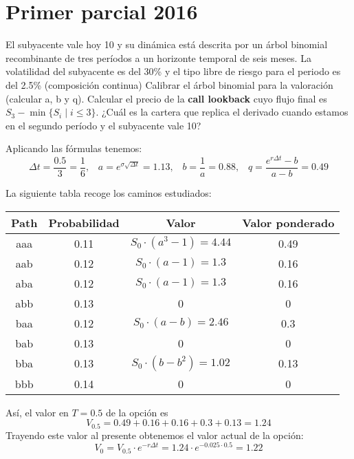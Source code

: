\section{Primer parcial 2016}
\begin{problem}[1]
El subyacente vale hoy 10 y su dinámica está descrita por un árbol binomial recombinante de tres períodos a un horizonte temporal de seis meses. La volatilidad del subyacente es del 30\% y el tipo libre de riesgo para el periodo es del 2.5\% (composición continua)
\ppart Calibrar el árbol binomial para la valoración (calcular a, b y q).
\ppart Calcular el precio de la \textbf{call lookback} cuyo flujo final es $S_3-\min\{S_i \mid i \leq 3\}$.
\ppart ¿Cuál es la cartera que replica el derivado cuando estamos en el segundo período y el subyacente vale 10?
\solution
{}

\spart
Aplicando las fórmulas tenemos:
\[Δt = \frac{0.5}{3} = \frac{1}{6},\;\;\; a=e^{σ\sqrt{Δt}}=1.13, \;\;\; b=\frac{1}{a}=0.88, \;\;\; q = \frac{e^{rΔt}-b}{a-b}=0.49\]

\spart

La siguiente tabla recoge los caminos estudiados:
\begin{center}
\begin{tabular}{|c|c|c|c|}
\hline
\textbf{Path} & \textbf{Probabilidad} & \textbf{Valor} & \textbf{Valor ponderado}\\
\hline
aaa & 0.11 & $S_0 \cdot \left( a^3-1\right) = 4.44 $ & 0.49\\
aab & 0.12 & $S_0 \cdot \left( a-1  \right) = 1.3 $ & 0.16\\
aba & 0.12 & $S_0 \cdot \left( a-1 \right) = 1.3 $ & 0.16\\
abb & 0.13 & 0 & 0 \\
baa & 0.12 & $S_0 \cdot \left( a-b \right) = 2.46 $ & 0.3\\
bab & 0.13 & 0 & 0 \\
bba & 0.13 & $S_0 \cdot \left( b-b^2 \right) = 1.02 $ & 0.13\\
bbb & 0.14 & 0 & 0 \\
\hline
\end{tabular}
\end{center}

Así, el valor en $T=0.5$ de la opción es
\[V_{0.5} = 0.49+0.16+0.16+0.3+0.13 = 1.24\]
Trayendo este valor al presente obtenemos el valor actual de la opción:
\[V_0 = V_{0.5}\cdot e^{-rΔt} = 1.24 \cdot e^{-0.025\cdot 0.5} = 1.22\]

\spart


\end{problem}
